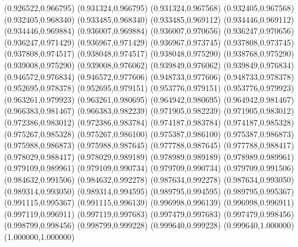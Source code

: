 (0.926522,0.966795)
(0.931324,0.966795)
(0.931324,0.967568)
(0.932405,0.967568)
(0.932405,0.968340)
(0.933485,0.968340)
(0.933485,0.969112)
(0.934446,0.969112)
(0.934446,0.969884)
(0.936007,0.969884)
(0.936007,0.970656)
(0.936247,0.970656)
(0.936247,0.971429)
(0.936967,0.971429)
(0.936967,0.973745)
(0.937808,0.973745)
(0.937808,0.974517)
(0.938048,0.974517)
(0.938048,0.975290)
(0.938768,0.975290)
(0.939008,0.975290)
(0.939008,0.976062)
(0.939849,0.976062)
(0.939849,0.976834)
(0.946572,0.976834)
(0.946572,0.977606)
(0.948733,0.977606)
(0.948733,0.978378)
(0.952695,0.978378)
(0.952695,0.979151)
(0.953776,0.979151)
(0.953776,0.979923)
(0.963261,0.979923)
(0.963261,0.980695)
(0.964942,0.980695)
(0.964942,0.981467)
(0.966383,0.981467)
(0.966383,0.982239)
(0.971905,0.982239)
(0.971905,0.983012)
(0.972386,0.983012)
(0.972386,0.983784)
(0.974187,0.983784)
(0.974187,0.985328)
(0.975267,0.985328)
(0.975267,0.986100)
(0.975387,0.986100)
(0.975387,0.986873)
(0.975988,0.986873)
(0.975988,0.987645)
(0.977788,0.987645)
(0.977788,0.988417)
(0.978029,0.988417)
(0.978029,0.989189)
(0.978989,0.989189)
(0.978989,0.989961)
(0.979109,0.989961)
(0.979109,0.990734)
(0.979709,0.990734)
(0.979709,0.991506)
(0.984632,0.991506)
(0.984632,0.992278)
(0.987634,0.992278)
(0.987634,0.993050)
(0.989314,0.993050)
(0.989314,0.994595)
(0.989795,0.994595)
(0.989795,0.995367)
(0.991115,0.995367)
(0.991115,0.996139)
(0.996998,0.996139)
(0.996998,0.996911)
(0.997119,0.996911)
(0.997119,0.997683)
(0.997479,0.997683)
(0.997479,0.998456)
(0.998799,0.998456)
(0.998799,0.999228)
(0.999640,0.999228)
(0.999640,1.000000)
(1.000000,1.000000)